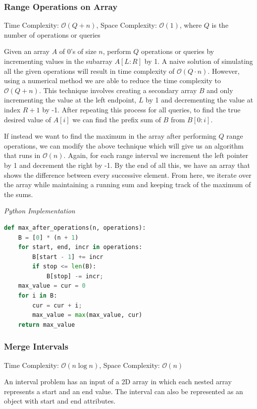 \documentclass{article}
\newcommand{\bigO}{\mathcal{O}}
\begin{document}
    \subsubsection{Range Operations on Array}
    Time Complexity: $\bigO(Q + n)$, Space Complexity: $\bigO(1)$, where $Q$ is the number of operations or queries
    
    Given an array $A$ of 0's of size $n$, perform $Q$ operations or queries by incrementing values in the subarray $A[L: R]$ by 1. A naive solution of simulating all the given operations will result in time complexity of $\bigO(Q\cdot n)$. However, using a numerical method we are able to reduce the time complexity to $\bigO(Q + n)$. This technique involves creating a secondary array $B$ and only incrementing the value at the left endpoint, $L$ by 1 and decrementing the value at index $R + 1$ by -1. After repeating this process for all queries, to find the true desired value of $A[i]$ we can find the prefix sum of $B$ from $B[0:i]$.
    
    If instead we want to find the maximum in the array after performing $Q$ range operations, we can modify the above technique which will give us an algorithm that runs in $\bigO(n)$. Again, for each range interval we increment the left pointer by 1 and decrement the right by -1. By the end of all this, we have an array that shows the difference between every successive element. From here, we iterate over the array while maintaining a running sum and keeping track of the maximum of the sums.
    
\vspace{8pt} \emph{Python Implementation}
\begin{lstlisting}[language=Python]
def max_after_operations(n, operations):
    B = [0] * (n + 1)
    for start, end, incr in operations:
        B[start - 1] += incr
        if stop <= len(B):
            B[stop] -= incr;
    max_value = cur = 0
    for i in B:
        cur = cur + i;
        max_value = max(max_value, cur)
    return max_value
\end{lstlisting}


    \subsubsection{Merge Intervals}
    Time Complexity: $\bigO(n \log n)$, Space Complexity: $\bigO(n)$
    
    An interval problem has an input of a 2D array in which each nested array represents a start and an end value. The interval can also be represented as an object with start and end attributes.
    
\end{document}
